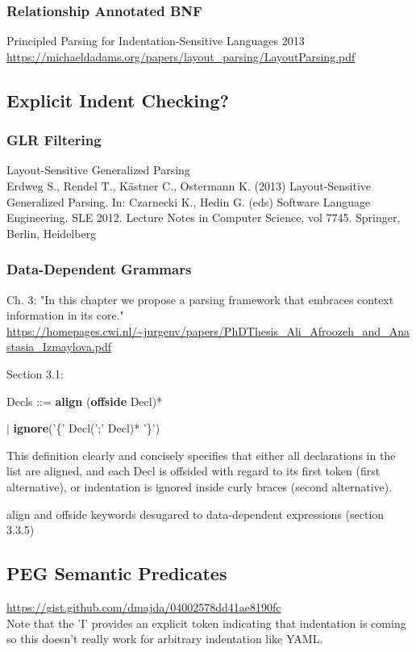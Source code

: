 \documentclass{book}
\begin{document}
\subsubsection{Relationship Annotated BNF}
Principled Parsing for Indentation-Sensitive Languages 2013\\
\url{https://michaeldadams.org/papers/layout_parsing/LayoutParsing.pdf}



\subsection{Explicit Indent Checking?}

\subsubsection{GLR Filtering}
Layout-Sensitive Generalized Parsing\\
Erdweg S., Rendel T., Kästner C., Ostermann K. (2013) Layout-Sensitive Generalized Parsing. In: Czarnecki K., Hedin G. (eds) Software Language Engineering. SLE 2012. Lecture Notes in Computer Science, vol 7745. Springer, Berlin, Heidelberg

\subsubsection{Data-Dependent Grammars}
Ch. 3: "In this chapter we propose a parsing framework that embraces context information in its core."\\
\url{https://homepages.cwi.nl/~jurgenv/papers/PhDThesis_Ali_Afroozeh_and_Anastasia_Izmaylova.pdf}\\

\vspace{10pt}

Section 3.1:
\par Decls ::= \textbf{align} (\textbf{offside} Decl)*
\par \:\:\:\: $\vert$ \textbf{ignore}('\{' Decl(';' Decl)* '\}')

This definition clearly and concisely specifies that either all declarations in the list are
aligned, and each Decl is offsided with regard to its first token (first alternative), or
indentation is ignored inside curly braces (second alternative).

align and offside keywords desugared to data-dependent expressions (section 3.3.5)

\subsection{PEG Semantic Predicates}
\url{https://gist.github.com/dmajda/04002578dd41ae8190fc}\\
Note that the 'I' provides an explicit token indicating that
indentation is coming so this doesn't really work
for arbitrary indentation like YAML.
\end{document}

